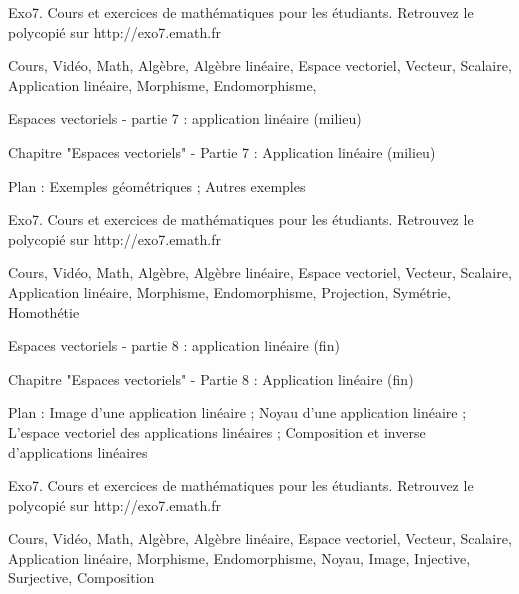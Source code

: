Exo7. Cours et exercices de mathématiques pour les étudiants.
Retrouvez le polycopié sur http://exo7.emath.fr


Cours, Vidéo, Math, Algèbre, Algèbre linéaire, Espace vectoriel, 
Vecteur, Scalaire, Application linéaire, Morphisme, Endomorphisme,




Espaces vectoriels - partie 7 : application linéaire (milieu)



Chapitre "Espaces vectoriels" - Partie 7 : Application linéaire (milieu)

Plan : Exemples géométriques ; Autres exemples

Exo7. Cours et exercices de mathématiques pour les étudiants.
Retrouvez le polycopié sur http://exo7.emath.fr


Cours, Vidéo, Math, Algèbre, Algèbre linéaire, Espace vectoriel, Vecteur, Scalaire, 
Application linéaire, Morphisme, Endomorphisme, Projection, Symétrie, Homothétie


Espaces vectoriels - partie 8 : application linéaire (fin)



Chapitre "Espaces vectoriels" - Partie 8 : Application linéaire (fin)

Plan : Image d'une application linéaire ; Noyau d'une application linéaire ;
L'espace vectoriel des applications linéaires ; Composition et inverse d'applications linéaires

Exo7. Cours et exercices de mathématiques pour les étudiants.
Retrouvez le polycopié sur http://exo7.emath.fr


Cours, Vidéo, Math, Algèbre, Algèbre linéaire, Espace vectoriel, Vecteur, Scalaire, 
Application linéaire, Morphisme, Endomorphisme, Noyau, Image, Injective, Surjective,
Composition
